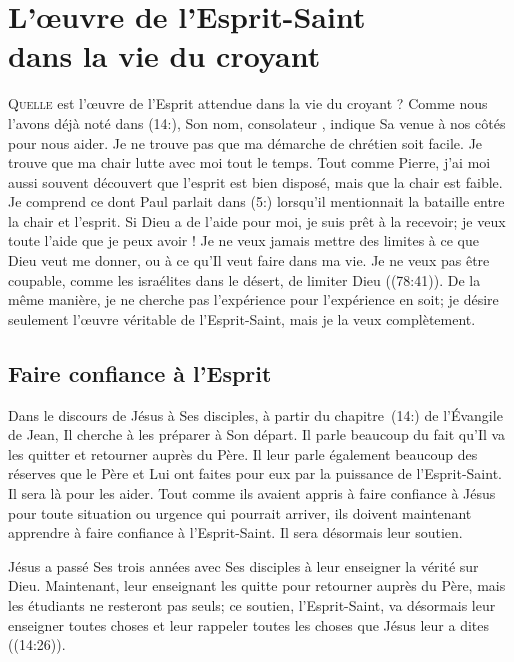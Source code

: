 \chapter[L'\oe{}uvre de l'Esprit-Saint dans la vie du croyant]{L'\oe{}uvre de l'Esprit-Saint\\ dans la vie du croyant}

\lettrine{Q}{uelle} est l'œuvre de l'Esprit
 attendue dans la vie du croyant ?
 Comme nous l'avons déjà noté dans (14:), Son nom,
 \Og con\-so\-la\-teur \Fg{}, indique Sa venue à nos côtés pour nous aider.
 Je ne trouve pas que ma démarche de chrétien soit facile.
 Je trouve que ma chair lutte avec moi tout le temps.
 Tout comme Pierre, j'ai moi aussi souvent découvert que l'esprit
 est bien disposé, mais que la chair est faible.
 Je comprend ce dont Paul parlait dans (5:) lorsqu'il
 mentionnait la bataille entre la chair et l'esprit.
 Si Dieu a de l'aide pour moi, je suis prêt à la recevoir;
 je veux toute l'aide que je peux avoir !
 Je ne veux jamais mettre des limites à ce que Dieu veut me donner,
 ou à ce qu'Il veut faire dans ma vie. Je ne veux pas être coupable,
 comme les israélites dans le désert,
 de limiter Dieu ((78:41)).
 De la même manière, je ne cherche pas l'expérience 
 pour l'expérience en soit; je désire seulement l'œuvre véritable
 de l'Esprit-Saint, mais je la veux complètement.

\section{Faire confiance \`a l'Esprit}

Dans le discours de Jésus à Ses disciples, à partir du chapitre~(14:)
 de l'Évangile de Jean, Il cherche à les préparer à Son départ.
 Il parle beaucoup du fait qu'Il va les quitter et retourner auprès du Père.
 Il leur parle également beaucoup des réserves que le Père et Lui
 ont faites pour eux par la puissance de l'Esprit-Saint.
 Il sera là pour les aider. Tout comme ils avaient appris à faire confiance
 à Jésus pour toute situation ou urgence qui pourrait arriver,
 ils doivent maintenant apprendre à faire confiance à l'Esprit-Saint.
 Il sera désormais leur soutien.

Jésus a passé Ses trois années avec Ses disciples à leur enseigner
 la vérité sur Dieu. Maintenant, leur enseignant les quitte pour retourner
 auprès du Père, mais les étudiants ne resteront pas seuls;
 ce soutien, l'Esprit-Saint, va désormais leur enseigner toutes choses
 et leur rappeler toutes les choses que Jésus leur a dites
 ((14:26)).

